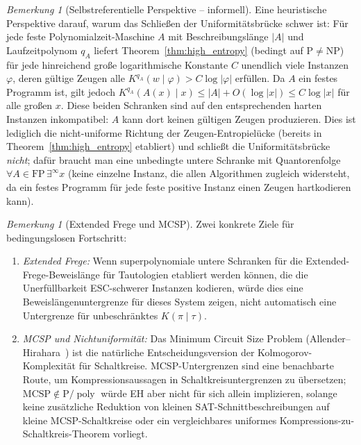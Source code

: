 \documentclass[aps,prd,twocolumn,superscriptaddress,nofootinbib]{revtex4-2}
\theoremstyle{definition}
\theoremstyle{remark}
\newtheorem{remark}[theorem]{Bemerkung}
\DeclareMathOperator{\poly}{poly}
\newcommand{\NP}{\mathrm{NP}}
\newcommand{\PP}{\mathrm{P}}
\begin{document}

\begin{remark}[Selbstreferentielle Perspektive -- informell]
\label{rem:self-referential}
Eine heuristische Perspektive darauf, warum das Schließen der Uniformitätsbrücke schwer ist: Für jede feste Polynomialzeit-Maschine $A$ mit Beschreibungslänge $|A|$ und Laufzeitpolynom $q_A$ liefert Theorem~\ref{thm:high_entropy} (bedingt auf $\PP \neq \NP$) für jede hinreichend große logarithmische Konstante $C$ unendlich viele Instanzen $\varphi$, deren gültige Zeugen alle $K^{q_A}(w \mid \varphi) > C\log|\varphi|$ erfüllen. Da $A$ ein festes Programm ist, gilt jedoch $K^{q_A}(A(x) \mid x) \leq |A| + O(\log |x|) \leq C\log |x|$ für alle großen $x$. Diese beiden Schranken sind auf den entsprechenden harten Instanzen inkompatibel: $A$ kann dort keinen gültigen Zeugen produzieren. Dies ist lediglich die nicht-uniforme Richtung der Zeugen-Entropielücke (bereits in Theorem~\ref{thm:high_entropy} etabliert) und schließt die Uniformitätsbrücke \emph{nicht}; dafür braucht man eine unbedingte untere Schranke mit Quantorenfolge $\forall A \in \mathrm{FP}\,\exists^\infty x$ (keine einzelne Instanz, die allen Algorithmen zugleich widersteht, da ein festes Programm für jede feste positive Instanz einen Zeugen hartkodieren kann).
\end{remark}

\begin{remark}[Extended Frege und MCSP]
\label{rem:frege-mcsp}
Zwei konkrete Ziele für bedingungslosen Fortschritt:
\begin{enumerate}
\item \emph{Extended Frege:} Wenn superpolynomiale untere Schranken für die Extended-Frege-Beweislänge für Tautologien etabliert werden können, die die Unerfüllbarkeit ESC-schwerer Instanzen kodieren, würde dies eine Beweislängenuntergrenze für dieses System zeigen, nicht automatisch eine Untergrenze für unbeschränktes $K(\pi\mid\tau)$.
\item \emph{MCSP und Nichtuniformität:} Das Minimum Circuit Size Problem (Allender--Hirahara~\cite{AllenderHirahara2019}) ist die natürliche Entscheidungsversion der Kolmogorov-Komplexität für Schaltkreise. MCSP-Untergrenzen sind eine benachbarte Route, um Kompressionsaussagen in Schaltkreisuntergrenzen zu übersetzen; $\mathrm{MCSP}\notin\PP/\poly$ würde EH aber nicht für sich allein implizieren, solange keine zusätzliche Reduktion von kleinen SAT-Schnittbeschreibungen auf kleine MCSP-Schaltkreise oder ein vergleichbares uniformes Kompressions-zu-Schaltkreis-Theorem vorliegt.
\end{enumerate}
\end{remark}
\end{document}
